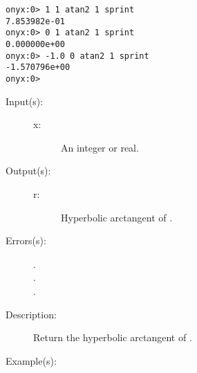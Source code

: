 \begin{description}
\begin{description}
\begin{verbatim}
onyx:0> 1 1 atan2 1 sprint
7.853982e-01
onyx:0> 0 1 atan2 1 sprint
0.000000e+00
onyx:0> -1.0 0 atan2 1 sprint
-1.570796e+00
onyx:0>
		\end{verbatim}
	\end{description}
\label{systemdict:atanh}
\item[{\onyxop{x}{atanh}{r}}: ]
	\begin{description}\item[]
	\item[Input(s): ]
		\begin{description}\item[]
		\item[x: ]
			An integer or real.
		\end{description}
	\item[Output(s): ]
		\begin{description}\item[]
		\item[r: ]
			Hyperbolic arctangent of .
		\end{description}
	\item[Errors(s): ]
		\begin{description}\item[]
		\item[.]
		\item[.]
		\item[.]
		\end{description}
	\item[Description: ]
		Return the hyperbolic arctangent of .
	\item[Example(s): ]\begin{verbatim}


\end{verbatim}
\end{description}
\end{description}
